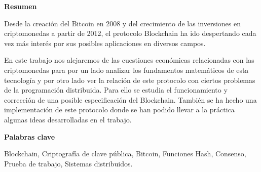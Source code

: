 
\newpage

\thispagestyle{empty}

\begin{center}

{\bf \Huge Resumen}

  \end{center}
\vspace{1cm}

Desde la creación del Bitcoin en 2008 y del crecimiento de las inversiones en criptomonedas a partir de 2012, el protocolo Blockchain ha ido despertando cada vez más interés por sus posibles aplicaciones en diversos campos.

En este trabajo nos alejaremos de las cuestiones económicas relacionadas con las criptomonedas para por un lado analizar los fundamentos matemáticos de esta tecnología y por otro lado ver la relación de este protocolo con ciertos problemas de la programación distribuida. Para ello se estudia el funcionamiento y corrección de una posible especificación del Blockchain. También se ha hecho una implementación de este protocolo donde se han podido llevar a la práctica algunas ideas desarrolladas en el trabajo.

\vspace{1cm}


\begin{center}

{\bf \Large Palabras clave}

   \end{center}

   \vspace{0.5cm}
   
   Blockchain, Criptografía de clave pública, Bitcoin, Funciones Hash, Consenso, Prueba de trabajo, Sistemas distribuidos.
   




